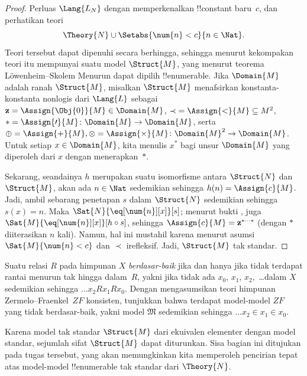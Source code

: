 \documentclass[../../../include/open-logic-section]{subfiles}
\begin{document}
\begin{proof}
Perluas $\Lang{L_N}$ dengan memperkenalkan !!{constant} baru~$c$, dan
perhatikan teori
\[
\Theory{N} \cup \Setabs{\num{n} < c}{n \in \Nat}.
\]
Teori tersebut dapat dipenuhi secara berhingga, sehingga menurut kekompakan teori
itu mempunyai suatu model $\Struct{M}$, yang menurut teorema
L\"owenheim--Skolem Menurun dapat dipilih !!{enumerable}. Jika
$\Domain{M}$ adalah ranah $\Struct{M}$, misalkan $\Struct{M}$ menafsirkan
konstanta-konstanta nonlogis dari $\Lang{L}$ sebagai $\mathbf{z} =
\Assign{\Obj{0}}{M} \in \Domain{M}$, ${\prec} = \Assign{<}{M} \subseteq
M^2$, $* = \Assign{\prime}{M} \colon \Domain{M} \to \Domain{M}$, serta
$\oplus = \Assign{+}{M}, \otimes = \Assign{\times}{M} \colon
\Domain{M}^2 \to \Domain{M}$. Untuk setiap $x \in \Domain{M}$, kita
menulis $x^*$ bagi unsur $\Domain{M}$ yang diperoleh dari $x$ dengan
menerapkan~$*$.

Sekarang, seandainya $h$ merupakan suatu isomorfisme antara $\Struct{N}$
dan $\Struct{M}$, akan ada $n \in \Nat$ sedemikian sehingga $h(n) =
\Assign{c}{M}$. Jadi, ambil sebarang penetapan $s$ dalam $\Struct{N}$
sedemikian sehingga $s(x) = n$. Maka $\Sat{N}{\eq[\num{n}][x]}[s]$;
menurut bukti , juga
$\Sat{M}{\eq[\num{n}][x]}[h \circ s]$, sehingga $\Assign{c}{M} =
\mathbf{z}^{*\cdots *}$ (dengan $*$ diiterasikan $n$ kali). Namun, hal ini
mustahil karena menurut asumsi $\Sat{M}{\num{n} < c}$ dan $\prec$
irefleksif. Jadi, $\Struct{M}$ tak standar.
\end{proof}

\begin{prob}
Suatu relasi $R$ pada himpunan $X$ \emph{berdasar-baik} jika dan hanya jika
tidak terdapat rantai menurun tak hingga dalam~$R$, yakni jika tidak ada
$x_0$, $x_1$, $x_2$,~\dots dalam $X$ sedemikian sehingga
$\dots x_2Rx_1Rx_0$. Dengan mengasumsikan teori himpunan
Zermelo--Fraenkel~$ZF$ konsisten, tunjukkan bahwa terdapat model-model $ZF$
yang tidak berdasar-baik, yakni model $\mathfrak{M}$ sedemikian sehingga
$\dots x_2 \in x_1 \in x_0$.
\end{prob}

Karena model tak standar $\Struct{M}$ dari  ekuivalen
elementer dengan model standar, sejumlah sifat $\Struct{M}$ dapat
diturunkan. Sisa bagian ini ditujukan pada tugas tersebut, yang akan
memungkinkan kita memperoleh pencirian tepat atas model-model !!{enumerable}
tak standar dari $\Theory{N}$.
\end{document}

